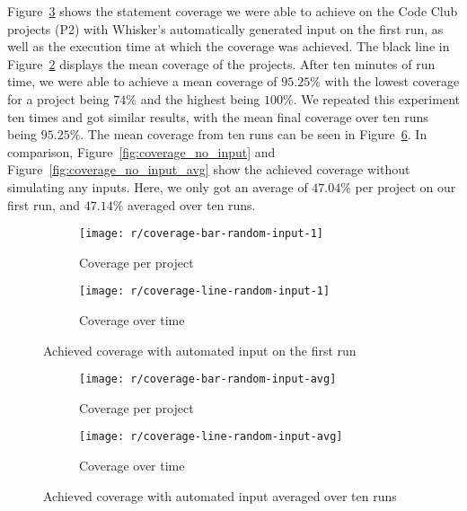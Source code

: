 \noindent Figure~\ref{fig:coverage} shows the statement coverage we were able to achieve on the Code Club projects (P2)
with Whisker's automatically generated input on the first run,
as well as the execution time at which the coverage was achieved.
The black line in Figure~\ref{fig:coverage_line} displays the mean coverage of the projects.
After ten minutes of run time, we were able to achieve a mean coverage of $95.25\%$ with the lowest coverage for a project being $74\%$ and the highest being $100\%$.
We repeated this experiment ten times and got similar results, with the mean final coverage over ten runs being $95.25\%$.
The mean coverage from ten runs can be seen in Figure~\ref{fig:coverage_avg}.
In comparison, Figure~\ref{fig:coverage_no_input} and Figure~\ref{fig:coverage_no_input_avg} show the achieved coverage without simulating any inputs.
Here, we only got an average of $47.04\%$ per project on our first run, and $47.14\%$ averaged over ten runs.
\parspace

\begin{figure}[htpb]
    \centering
    \begin{subfigure}{.95\textwidth}
        \texttt{[image: r/coverage-bar-random-input-1]}
        \caption{Coverage per project}
        \label{fig:coverage_bar}
    \end{subfigure}

    \bigskip

    \begin{subfigure}{.95\textwidth}
        \texttt{[image: r/coverage-line-random-input-1]}
        \caption{Coverage over time}
        \label{fig:coverage_line}
    \end{subfigure}

    \caption{Achieved coverage with automated input on the first run}
    \label{fig:coverage}
\end{figure}

\begin{figure}[htpb]
    \centering
    \begin{subfigure}{.95\textwidth}
        \texttt{[image: r/coverage-bar-random-input-avg]}
        \caption{Coverage per project}
        \label{fig:coverage_bar_avg}
    \end{subfigure}

    \bigskip

    \begin{subfigure}{.95\textwidth}
        \texttt{[image: r/coverage-line-random-input-avg]}
        \caption{Coverage over time}
        \label{fig:coverage_line_avg}
    \end{subfigure}

    \caption{Achieved coverage with automated input averaged over ten runs}
    \label{fig:coverage_avg}
\end{figure}

